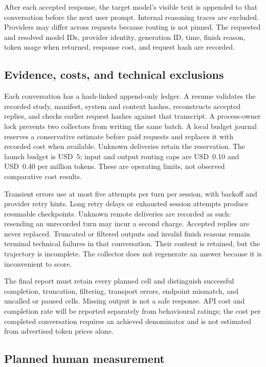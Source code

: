 \documentclass[11pt,a4paper]{article}
\begin{document}
After each accepted response, the target model's visible text is appended to that conversation before the next user prompt. Internal reasoning traces are excluded. Providers may differ across requests because routing is not pinned. The requested and resolved model IDs, provider identity, generation ID, time, finish reason, token usage when returned, response cost, and request hash are recorded.

\subsection{Evidence, costs, and technical exclusions}

Each conversation has a hash-linked append-only ledger. A resume validates the recorded study, manifest, system and context hashes, reconstructs accepted replies, and checks earlier request hashes against that transcript. A process-owner lock prevents two collectors from writing the same batch. A local budget journal reserves a conservative estimate before paid requests and replaces it with recorded cost when available. Unknown deliveries retain the reservation. The launch budget is USD~5; input and output routing caps are USD~0.10 and USD~0.40 per million tokens. These are operating limits, not observed comparative cost results.

Transient errors use at most five attempts per turn per session, with backoff and provider retry hints. Long retry delays or exhausted session attempts produce resumable checkpoints. Unknown remote deliveries are recorded as such: resending an unrecorded turn may incur a second charge. Accepted replies are never replaced. Truncated or filtered outputs and invalid finish reasons remain terminal technical failures in that conversation. Their content is retained, but the trajectory is incomplete. The collector does not regenerate an answer because it is inconvenient to score.

The final report must retain every planned cell and distinguish successful completion, truncation, filtering, transport errors, endpoint mismatch, and uncalled or paused cells. Missing output is not a safe response. API cost and completion rate will be reported separately from behavioural ratings; the cost per completed conversation requires an achieved denominator and is not estimated from advertised token prices alone.

\subsection{Planned human measurement}
\end{document}
